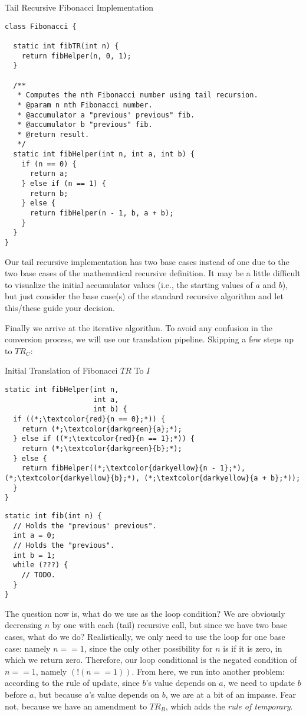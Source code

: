 \begin{cl}[]{Tail Recursive Fibonacci Implementation}
\begin{lstlisting}[language=MyJava]
class Fibonacci {

  static int fibTR(int n) {
    return fibHelper(n, 0, 1);
  }

  /**
   * Computes the nth Fibonacci number using tail recursion.
   * @param n nth Fibonacci number.
   * @accumulator a "previous' previous" fib.
   * @accumulator b "previous" fib.
   * @return result.
   */
  static int fibHelper(int n, int a, int b) {
    if (n == 0) {
      return a;
    } else if (n == 1) {
      return b;
    } else {
      return fibHelper(n - 1, b, a + b);
    }
  }
}
\end{lstlisting}
\end{cl}

Our tail recursive implementation has two base cases instead of one due to the two base cases of the mathematical recursive definition. It may be a little difficult to visualize the initial accumulator values (i.e., the starting values of $a$ and $b$), but just consider the base case(s) of the standard recursive algorithm and let this/these guide your decision.

Finally we arrive at the iterative algorithm. To avoid any confusion in the conversion process, we will use our translation pipeline. Skipping a few steps up to $TR_\textit{C}$:

\begin{clrr}[]{Initial Translation of Fibonacci $TR$ To $I$}
\begin{lstlisting}[language=MyJava]
static int fibHelper(int n, 
                     int a, 
                     int b) {
  if ((*;\textcolor{red}{n == 0};*)) {
    return (*;\textcolor{darkgreen}{a};*);
  } else if ((*;\textcolor{red}{n == 1};*)) {
    return (*;\textcolor{darkgreen}{b};*);
  } else {
    return fibHelper((*;\textcolor{darkyellow}{n - 1};*), (*;\textcolor{darkyellow}{b};*), (*;\textcolor{darkyellow}{a + b};*));
  }
}
\end{lstlisting}
\tcblower
\begin{lstlisting}[language=MyJavaNLN]
static int fib(int n) {
  // Holds the "previous' previous".
  int a = 0;
  // Holds the "previous".
  int b = 1;
  while (???) {
    // TODO.
  }
}
\end{lstlisting}
\end{clrr}

The question now is, what do we use as the  loop condition? We are obviously decreasing $n$ by one with each (tail) recursive call, but since we have two base cases, what do we do? Realistically, we only need to use the loop for one base case: namely $n == 1$, since the only other possibility for $n$ is if it is zero, in which we return zero. Therefore, our loop conditional is the negated condition of $n == 1$, namely $(!(n == 1))$. From here, we run into another problem: according to the rule of update, since $b$'s value depends on $a$, we need to update $b$ before $a$, but because $a$'s value depends on $b$, we are at a bit of an impasse. Fear not, because we have an amendment to $TR_\textit{B}$, which adds the \textit{rule of temporary}.

